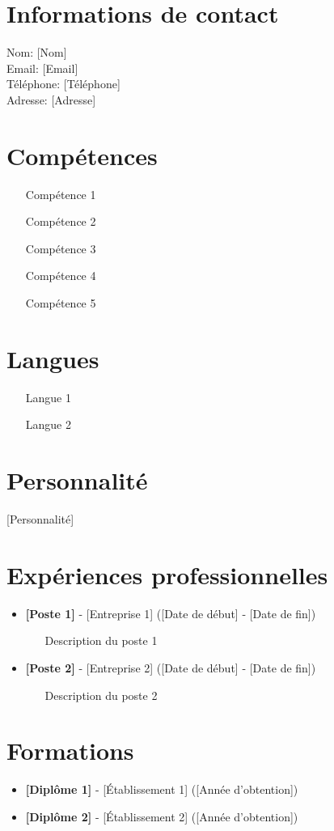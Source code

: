 \documentclass{article}
\begin{document}
\section*{Informations de contact}

Nom: [Nom] \\
Email: [Email] \\
Téléphone: [Téléphone] \\
Adresse: [Adresse]

\section*{Compétences}

\begin{itemize}
    \item [Compétence 1]
    \item [Compétence 2]
    \item [Compétence 3]
    \item [Compétence 4]
    \item [Compétence 5]
\end{itemize}

\section*{Langues}

\begin{itemize}
    \item [Langue 1]
    \item [Langue 2]
\end{itemize}

\section*{Personnalité}

[Personnalité]

\section*{Expériences professionnelles}

\begin{itemize}
    \item \textbf{[Poste 1]} - [Entreprise 1] ([Date de début] - [Date de fin])
    \begin{itemize}
        \item [Description du poste 1]
    \end{itemize}
    \item \textbf{[Poste 2]} - [Entreprise 2] ([Date de début] - [Date de fin])
    \begin{itemize}
        \item [Description du poste 2]
    \end{itemize}
\end{itemize}

\section*{Formations}

\begin{itemize}
    \item \textbf{[Diplôme 1]} - [Établissement 1] ([Année d'obtention])
    \item \textbf{[Diplôme 2]} - [Établissement 2] ([Année d'obtention])
\end{itemize}
\end{document}
